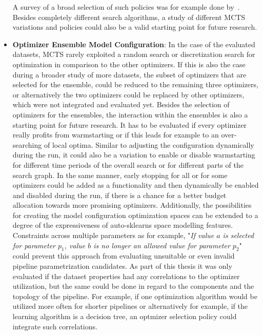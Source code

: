 \begin{itemize}
    A survey of a broad selection of such policies was for example done by~\textcite{Browne-Policies}.
    Besides completely different search algorithms, a study of different MCTS variations and policies could also be a valid starting point for future research.
    \item \textbf{Optimizer Ensemble Model Configuration}: In the case of the evaluated datasets, MCTS rarely exploited a random search or discretization search for optimization in comparison to the other optimizers.
    If this is also the case during a broader study of more datasets, the subset of optimizers that are selected for the ensemble, could be reduced to the remaining three optimizers, or alternatively the two optimizers could be replaced by other optimizers, which were not integrated and evaluated yet.\newline
    Besides the selection of optimizers for the ensembles, the interaction within the ensembles is also a starting point for future research.
    It has to be evaluated if every optimizer really profits from warmstarting or if this leads for example to an over-searching of local optima.\newline
    Similar to adjusting the configuration dynamically during the run, it could also be a variation to enable or disable warmstarting for different time periods of the overall search or for different parts of the search graph.
    In the same manner, early stopping for all or for some optimizers could be added as a functionality and then dynamically be enabled and disabled during the run, if there is a chance for a better budget allocation towards more promising optimizers.\newline
    Additionally, the possibilities for creating the model configuration optimization spaces can be extended to a degree of the expressiveness of auto-sklearns space modelling features.
    Constraints across multiple parameters as for example, "\textit{If value $a$ is selected for parameter $p_1$, value $b$ is no longer an allowed value for parameter $p_2$}" could prevent this approach from evaluating unsuitable or even invalid pipeline parametrization candidates.\newline
    As part of this thesis it was only evaluated if the dataset properties had any correlations to the optimizer utilization, but the same could be done in regard to the components and the topology of the pipeline.
    For example, if one optimization algorithm would be utilized more often for shorter pipelines or alternatively for example, if the learning algorithm is a decision tree, an optmizer selection policy could integrate such correlations.

\end{itemize}
